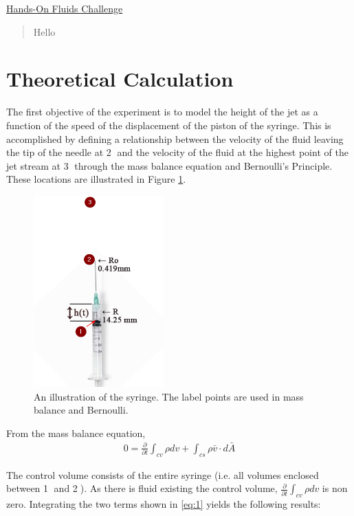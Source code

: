 \documentclass{article}
\begin{document}
\begin{center}\underline{\huge Hands-On Fluids Challenge}\end{center}

\begin{abstract}
Hello
\end{abstract} 

\section{Theoretical Calculation}
%
The first objective of the experiment is to model the height of the jet as a function of the speed of the displacement of the piston of the syringe. This is accomplished by defining a relationship between the velocity of the fluid leaving the tip of the needle at \textcircled{2} and the velocity of the fluid at the highest point of the jet stream at \textcircled{3} through the mass balance equation and Bernoulli's Principle. These locations are illustrated in Figure \ref{fig:1}.

%
\begin{figure}[h!]
\centering
  \includegraphics[width=50mm]{Syringe.png}
  \captionsetup{justification=centering}
  \caption{An illustration of the syringe. The label points are used in mass balance and Bernoulli.}
  \label{fig:1}
\end{figure}
%
From the mass balance equation,
\begin{align*}
0= \frac{\partial}{\partial{t}} \int_{cv} \rho dv + \int_{cs} \rho \bar{v} \cdot d\bar{A} \label{eq:1} 
\end{align*} 

The control volume consists of the entire syringe (i.e. all volumes enclosed between \textcircled{1} and \textcircled{2}). As there is fluid existing the control volume, $\frac{\partial}{\partial{t}} \int_{cv} \rho dv$ is non zero. Integrating the two terms shown in \eqref{eq:1} yields the following results:
\end{document}
